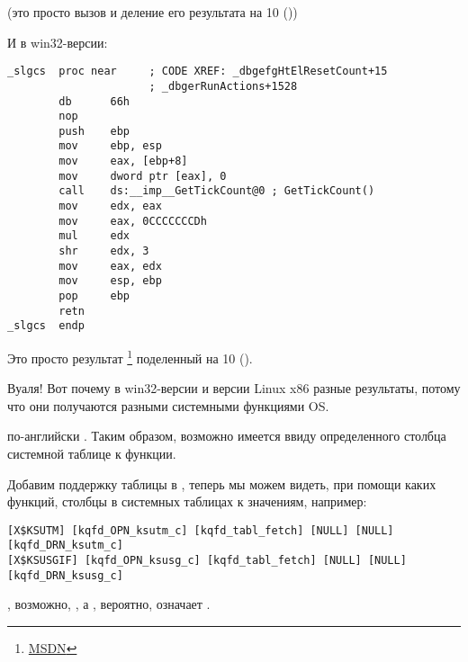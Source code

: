 (это просто вызов  и деление его результата на 10 ())

И в win32-версии:

\begin{lstlisting}[style=customasmx86]
_slgcs  proc near     ; CODE XREF: _dbgefgHtElResetCount+15
                      ; _dbgerRunActions+1528
        db      66h
        nop
        push    ebp
        mov     ebp, esp
        mov     eax, [ebp+8]
        mov     dword ptr [eax], 0
        call    ds:__imp__GetTickCount@0 ; GetTickCount()
        mov     edx, eax
        mov     eax, 0CCCCCCCDh
        mul     edx
        shr     edx, 3
        mov     eax, edx
        mov     esp, ebp
        pop     ebp
        retn
_slgcs  endp
\end{lstlisting}

Это просто результат 
\footnote{\href{http://go.yurichev.com/17248}{MSDN}}
поделенный на 10 ().

Вуаля! Вот почему в win32-версии и версии Linux x86 разные результаты, потому что они получаются разными 
системными функциями \ac{OS}.

 по-английски . Таким образом, возможно имеется ввиду  
определенного столбца системной таблице к функции.

Добавим поддержку таблицы  в \oracletables, 
теперь мы можем видеть, при помощи каких функций, столбцы в системных таблицах  к значениям, 
например:

\begin{lstlisting}
[X$KSUTM] [kqfd_OPN_ksutm_c] [kqfd_tabl_fetch] [NULL] [NULL] [kqfd_DRN_ksutm_c]
[X$KSUSGIF] [kqfd_OPN_ksusg_c] [kqfd_tabl_fetch] [NULL] [NULL] [kqfd_DRN_ksusg_c]
\end{lstlisting}

, возможно, , а , вероятно, означает .

